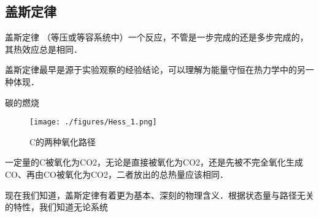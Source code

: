 
\subsection{盖斯定律}
\begin{theorem}{盖斯定律}
（等压或等容系统中）一个反应，不管是一步完成的还是多步完成的，其热效应总是相同．
\end{theorem}
盖斯定律最早是源于实验观察的经验结论，可以理解为能量守恒在热力学中的另一种体现．

\begin{example}{碳的燃烧}
\begin{figure}[ht]
\centering
\texttt{[image: ./figures/Hess\_1.png]}
\caption{C的两种氧化路径} \label{Hess_fig1}
\end{figure}
一定量的C被氧化为CO2，无论是直接被氧化为CO2，还是先被不完全氧化生成CO、再由CO被氧化为CO2，二者放出的总热量应该相同．
\end{example}

现在我们知道，盖斯定律有着更为基本、深刻的物理含义．根据状态量与路径无关的特性，我们知道无论系统

